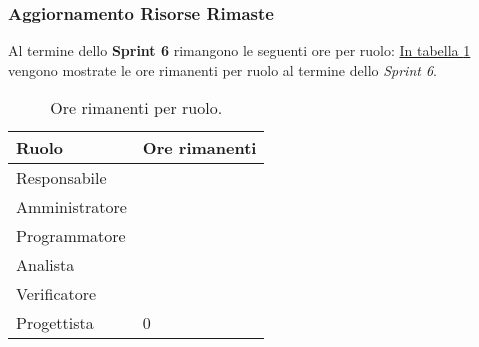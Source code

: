 \subsubsection{Aggiornamento Risorse Rimaste}
\label{sec:AggiornamentoRisorse_Sprint6}
Al termine dello \textbf{Sprint 6} rimangono le seguenti ore per ruolo: \hyperref[tab:sprint6_ore_rimanenti]{In tabella \ref{tab:sprint6_ore_rimanenti}} vengono mostrate le ore rimanenti per ruolo al termine dello \textit{Sprint 6}.

\begin{table}[H]
    \centering
    \begin{tabular}{| l | l |}
    \hline
    \textbf{Ruolo} & 
    \textbf{Ore rimanenti}\\
    \hline
        Responsabile & \\
    \hline
        Amministratore & \\
    \hline
        Programmatore & \\
    \hline
        Analista & \\
    \hline
        Verificatore & \\
    \hline
        Progettista & 0\\
    \hline
    \end{tabular}
    \caption{Ore rimanenti per ruolo.}
    \label{tab:sprint6_ore_rimanenti} 
\end{table}